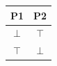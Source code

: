 \begin{tabular}{cc}
\toprule
\textbf{P1} & \textbf{P2}\\
\midrule
\(\bot\) & \(\top\)\\
\(\top\) & \(\bot\)\\
\bottomrule
\end{tabular}
